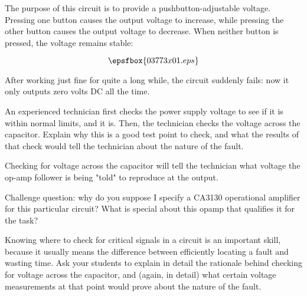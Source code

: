 

The purpose of this circuit is to provide a pushbutton-adjustable voltage.  Pressing one button causes the output voltage to increase, while pressing the other button causes the output voltage to decrease.  When neither button is pressed, the voltage remains stable:

$$\epsfbox{03773x01.eps}$$

After working just fine for quite a long while, the circuit suddenly fails: now it only outputs zero volts DC all the time.

An experienced technician first checks the power supply voltage to see if it is within normal limits, and it is.  Then, the technician checks the voltage across the capacitor.  Explain why this is a good test point to check, and what the results of that check would tell the technician about the nature of the fault.







Checking for voltage across the capacitor will tell the technician what voltage the op-amp follower is being "told" to reproduce at the output.

\vskip 10pt

Challenge question: why do you suppose I specify a CA3130 operational amplifier for this particular circuit?  What is special about this opamp that qualifies it for the task?







Knowing where to check for critical signals in a circuit is an important skill, because it usually means the difference between efficiently locating a fault and wasting time.  Ask your students to explain in detail the rationale behind checking for voltage across the capacitor, and (again, in detail) what certain voltage measurements at that point would prove about the nature of the fault.




